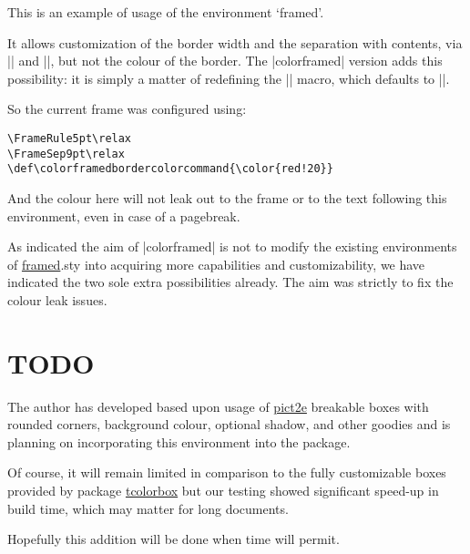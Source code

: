 \documentclass[a4paper,dvipdfmx,11pt]{article}
\def\ctanpackage#1{\href{https://ctan.org/pkg/#1}{#1}}
\begin{document}
\relax
{}\relax
\def\colorframedbordercolorcommand{\color{red!20}}

\begin{framed}
  This is an example of usage of the environment `framed'.

  It allows customization of the border width and the
  separation with contents, via |\FrameRule| and |\FrameSep|,
  but not the colour of the border.  The |colorframed| version
  adds this possibility: it is simply a matter of redefining
  the |\colorframedbordercolorcommand| macro, which defaults
  to |\normalcolor|.

\color{blue}
  So the current frame was configured using:
\begin{verbatim}
\FrameRule5pt\relax
\FrameSep9pt\relax
\def\colorframedbordercolorcommand{\color{red!20}}
\end{verbatim}
And the colour here will not leak out to the frame or to the
text following this environment, even in case of a pagebreak.
\end{framed}

As indicated the aim of |colorframed| is not to modify the
existing environments of \ctanpackage{framed}.sty into
acquiring more capabilities and customizability, we have
indicated the two sole extra possibilities already. The aim
was strictly to fix the colour leak issues.

\section{TODO}

The author has developed based upon usage of
\ctanpackage{pict2e} breakable boxes with rounded corners,
background colour, optional shadow, and other goodies and is
planning on incorporating this environment into the package.

Of course, it will remain limited in comparison to the fully
customizable boxes provided by package \ctanpackage{tcolorbox}
but our testing showed significant speed-up in build time, which
may matter for long documents.

Hopefully this addition will be done when time will permit.
\end{document}
